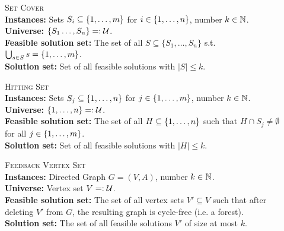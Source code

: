 \begin{samepage}
    \begin{mdframed}
    	\begin{description}
        \item[]\textsc{Set Cover}\hfill\\
        \textbf{Instances:} Sets $S_i \subseteq \{ 1, \ldots, m \}$ for $i \in \{ 1, \ldots, n \}$, number $k \in \mathbb{N}$.\\
        \textbf{Universe:} $\{S_1 \dots, S_n\} =: \mathcal{U}$.\\
        \textbf{Feasible solution set:} The set of all $S \subseteq \{S_1, \dots, S_n\}$ s.t. $\bigcup_{s \in S} s = \{ 1, \ldots, m \}$.\\
        \textbf{Solution set:} Set of all feasible solutions with $|S| \leq k$.
    	\end{description}
    \end{mdframed}
\end{samepage}

\begin{samepage}
    \begin{mdframed}
    	\begin{description}   
        \item[]\textsc{Hitting Set}\hfill\\
        \textbf{Instances:} Sets $S_j \subseteq \{ 1, \ldots, n \}$ for $j \in \{ 1, \ldots, m \}$, number $k \in \mathbb{N}$.\\
        \textbf{Universe:} $\{ 1, \ldots, n \} =: \mathcal{U}$.\\
        \textbf{Feasible solution set:} The set of all $H \subseteq \{ 1, \ldots, n \}$ such that $H \cap S_j \neq \emptyset$ for all $j \in \{ 1, \ldots, m \}$.\\
        \textbf{Solution set:} Set of all feasible solutions with $|H| \leq k$.
    	\end{description}
    \end{mdframed}
\end{samepage}

\begin{samepage}
    \begin{mdframed}
    	\begin{description}
        \item[]\textsc{Feedback Vertex Set}\hfill\\
        \textbf{Instances:} Directed Graph $G = (V, A)$, number $k \in \mathbb{N}$.\\
        \textbf{Universe:} Vertex set $V =: \mathcal{U}$.\\
        \textbf{Feasible solution set:} The set of all vertex sets $V' \subseteq V$ such that after deleting $V'$ from $G$, the resulting graph is cycle-free (i.e. a forest).\\
        \textbf{Solution set:} The set of all feasible solutions $V'$ of size at most $k$.
    	\end{description}
    \end{mdframed}
\end{samepage}

